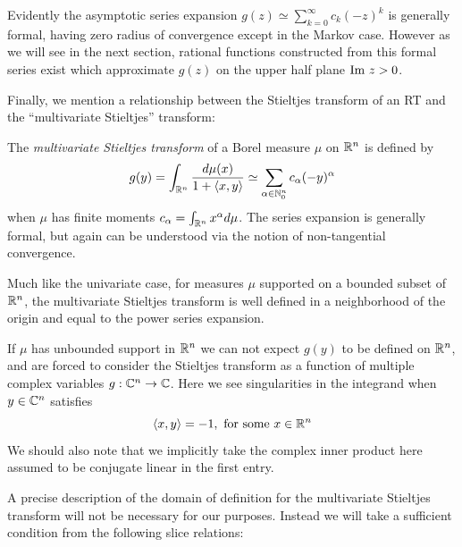 
Evidently the asymptotic series expansion $g(z) \simeq \sum_{k=0}^\infty c_k {(-z)}^k$ is generally formal, having zero radius of convergence except in the Markov case. However as we will see in the next section, rational functions constructed from this formal series exist which approximate $g(z)$ on the upper half plane $\text{Im}~ z > 0$.

Finally, we mention a relationship between the Stieltjes transform of an RT and the ``multivariate Stieltjes'' transform:
\begin{definition}
  The \emph{multivariate Stieltjes transform} of a Borel measure $\mu$ on $\mathbb{R}^n$ is defined by
  \[
    g(y) = \int_{\mathbb{R}^n} \frac{d\mu(x)}{1 + \langle x, y\rangle} \simeq \sum_{\alpha \in \mathbb{N}_0^n} c_\alpha(-y)^\alpha
  \]
  when $\mu$ has finite moments $c_\alpha = \int_{\mathbb{R}^n} x^\alpha d\mu$. The series expansion is generally formal, but again can be understood via the notion of non-tangential convergence.
\end{definition}

\begin{remark}
  Much like the univariate case, for measures $\mu$ supported on a bounded subset of $\mathbb{R}^n$, the multivariate Stieltjes transform is well defined in a neighborhood of the origin and equal to the power series expansion. 

  If $\mu$ has unbounded support in $\mathbb{R}^n$ we can not expect $g(y)$ to be defined on $\mathbb{R}^n$, and are forced to consider the Stieltjes transform as a function of multiple complex variables $g : \mathbb{C}^n \to \mathbb{C}$. Here we see singularities in the integrand when $y \in \mathbb{C}^n$ satisfies
  \[
    \left\langle x, y \right\rangle = -1, \text{ for some } x \in \mathbb{R}^n
  \]
  We should also note that we implicitly take the complex inner product here assumed to be conjugate linear in the first entry.
\end{remark}

A precise description of the domain of definition for the multivariate Stieltjes transform will not be necessary for our purposes. Instead we will take a sufficient condition from the following slice relations:

